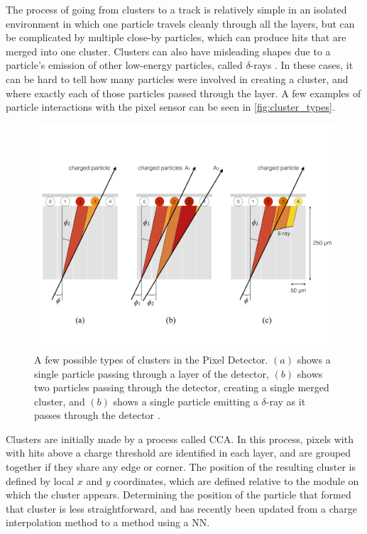 The process of going from clusters to a track is relatively simple in an isolated environment in which one particle travels cleanly through all the layers, but can be complicated by multiple close-by particles, which can produce hits that are merged into one cluster. Clusters can also have misleading shapes due to a particle's emission of other low-energy particles, called $\delta$-rays \cite{PERF-2012-05}. In these cases, it can be hard to tell how many particles were involved in creating a cluster, and where exactly each of those particles passed through the layer. A few examples of particle interactions with the pixel sensor can be seen in \autoref{fig:cluster_types}. 

\begin{centering}
\begin{figure}[bth]
\myfloatalign
\includegraphics[width=.90\linewidth]{figures/nn/cluster_types.pdf}
\caption{A few possible types of clusters in the Pixel Detector. $(a)$ shows a single particle passing through a layer of the detector, $(b)$ shows two particles passing through the detector, creating a single merged cluster, and $(b)$ shows a single particle emitting a $\delta$-ray as it passes through the detector \cite{PERF-2012-05}.}
\label{fig:cluster_types}
\end{figure}
\end{centering}

Clusters are initially made by a process called \acf{CCA}. In this process, pixels with with hits above a charge threshold are identified in each layer, and are grouped together if they share any edge or corner. The position of the resulting cluster is defined by local $x$ and $y$ coordinates, which are defined relative to the module on which the cluster appears. Determining the position of the particle that formed that cluster is less straightforward, and has recently been updated from a charge interpolation method to a method using a \acf{NN}. 

